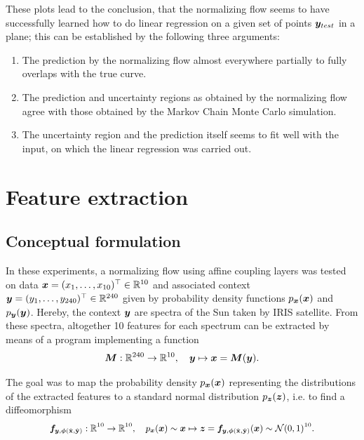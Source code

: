 \documentclass[a4paper,12pt]{report}
\begin{document}
These plots lead to the conclusion, that the normalizing flow seems to have successfully learned how to do linear regression on a given set of points $\bm{y}_{test}$ in a plane; this can be established by the following three arguments:
\begin{enumerate}
\item The prediction by the normalizing flow almost everywhere partially to fully overlaps with the true curve.
\item The prediction and uncertainty regions as obtained by the normalizing flow agree with those obtained by the Markov Chain Monte Carlo simulation.
\item The uncertainty region and the prediction itself seems to fit well with the input, on which the linear regression was carried out.
\end{enumerate}

\FloatBarrier
\section{Feature extraction}
\subsection{Conceptual formulation}
In these experiments, a normalizing flow using affine coupling layers was tested on data $\bm{x}=(x_1,\dots,x_{10})^\top \in \mathbb{R}^{10}$ and associated context $\bm{y}=(y_1,\dots,y_{240})^\top \in \mathbb{R}^{240}$ given by probability density functions $p_{\bm{x}}(\bm{x})$ and $p_{\bm{y}}(\bm{y})$. Hereby, the context $\bm{y}$ are spectra of the Sun taken by IRIS satellite. From these spectra, altogether 10 features for each spectrum can be extracted by means of a program implementing a function
\begin{equation}\label{eq:featureextraction}
\bm{M}:\mathbb{R}^{240} \rightarrow \mathbb{R}^{10}, \quad \bm{y}\mapsto \bm{x} = \bm{M}(\bm{y}).
\end{equation}

The goal was to map the probability density $p_{\bm{x}}(\bm{x})$ representing the distributions of the extracted features to a standard normal distribution $p_{\bm{z}}(\bm{z})$, i.e. to find a diffeomorphism
\begin{align}\small\begin{aligned}
\bm{f}_{\bm{y},\bm{\phi}(\hat{\boldsymbol{\mathbf{x}}},\hat{\boldsymbol{\mathbf{y}}})}: \mathbb{R}^{10} \rightarrow \mathbb{R}^{10}, \quad p_{\bm{x}}(\bm{x}) \sim \bm{x} \mapsto \bm{z} = \bm{f}_{\bm{y},\bm{\phi}(\hat{\boldsymbol{\mathbf{x}}},\hat{\boldsymbol{\mathbf{y}}})}(\bm{x}) \sim  \mathcal{N}(0,1)^{10}.
\end{aligned}\end{align}
\end{document}
